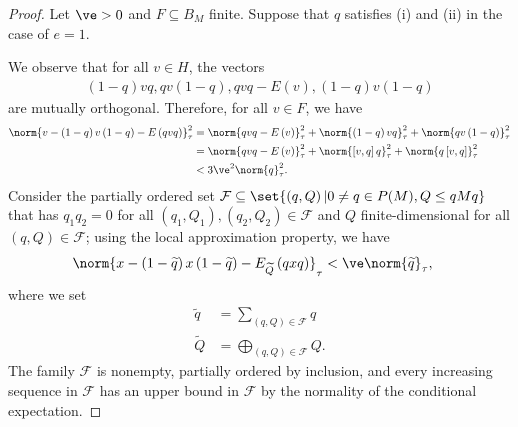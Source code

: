 \documentclass[10pt]{mypackage}
\begin{document}
\begin{proof}
  Let $\ve > 0$ and $F\subseteq B_M$ finite. Suppose that $q$ satisfies (i) and (ii) in the case of $e = 1$.

  We observe that for all $v\in H$, the vectors
  \begin{align*}
    \left( 1-q \right)vq,qv\left( 1-q \right),qvq-E(v),\left( 1-q \right)v\left( 1-q \right)
  \end{align*}
  are mutually orthogonal. Therefore, for all $v\in F$, we have
  \begin{align*}
    \norm{v - \left( 1-q \right)v\left( 1-q \right) - E\left( qvq \right)}_{\tau}^2 &= \norm{qvq - E\left( v \right)}_{\tau}^2 + \norm{\left( 1-q \right)vq}_{\tau}^2 + \norm{qv\left( 1-q \right)}_{\tau}^2\\
                                                                                    &= \norm{qvq - E\left( v \right)}_{\tau}^2 + \norm{\left[ v,q \right]q}_{\tau}^2 + \norm{q\left[ v,q \right]}_{\tau}^2\\
                                                                                    &< 3\ve^2\norm{q}_{\tau}^2.
  \end{align*}
  Consider the partially ordered set $ \mathcal{F}\subseteq \set{\left( q,Q \right) | 0\neq q\in P(M), Q\leq qMq} $ that has $q_1q_2 = 0$ for all $\left( q_1,Q_1 \right),\left( q_2,Q_2 \right)\in \mathcal{F}$ and $Q$ finite-dimensional for all $\left( q,Q \right)\in \mathcal{F}$; using the local approximation property, we have
  \begin{align*}
    \norm{x-\left( 1-\widetilde{q} \right)x\left( 1-\widetilde{q} \right) - E_{ \widetilde{Q} }\left( qxq \right)}_{\tau} &< \ve\norm{\widetilde{q}}_{\tau},
  \end{align*}
  where we set
  \begin{align*}
    \widetilde{q} &= \sum_{\left( q,Q \right)\in \mathcal{F}}q\\
    \widetilde{Q} &= \bigoplus_{\left( q,Q \right)\in \mathcal{F}} Q.
  \end{align*}
  The family $\mathcal{F}$ is nonempty, partially ordered by inclusion, and every increasing sequence in $\mathcal{F}$ has an upper bound in $ \mathcal{F} $ by the normality of the conditional expectation.


\end{proof}
\end{document}
